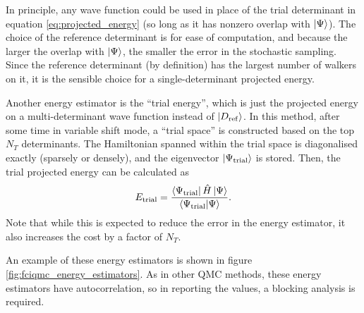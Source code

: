 In principle, any wave function could be used in place of the trial determinant in equation \ref{eq:projected_energy} (so long as it has nonzero overlap with $\ket\Psi$). The choice of the reference determinant is for ease of computation, and because the larger the overlap with $\ket\Psi$, the smaller the error in the stochastic sampling. Since the reference determinant (by definition) has the largest number of walkers on it, it is the sensible choice for a single-determinant projected energy.

Another energy estimator is the ``trial energy'',\supercite{Blunt2015,Petruzielo} which is just the projected energy on a multi-determinant wave function instead of $\ket{D_\mathrm{ref}}$. In this method, after some time in variable shift mode, a ``trial space'' is constructed based on the top $N_T$ determinants. The Hamiltonian spanned within the trial space is diagonalised exactly (sparsely or densely), and the eigenvector $\ket{\Psi_\mathrm{trial}}$ is stored. Then, the trial projected energy can be calculated as
\begin{equation}
    E_\mathrm{trial} = \frac{\bra{\Psi_\mathrm{trial}}\hat H\ket{\Psi}}{\braket{\Psi_\mathrm{trial}}{\Psi}}.
\end{equation}
Note that while this is expected to reduce the error in the energy estimator, it also increases the cost by a factor of $N_T$.

An example of these energy estimators is shown in figure \ref{fig:fciqmc_energy_estimators}. As in other \gls{QMC} methods, these energy estimators have autocorrelation, so in reporting the values, a blocking analysis is required.\supercite{flyvbjergError1989}


